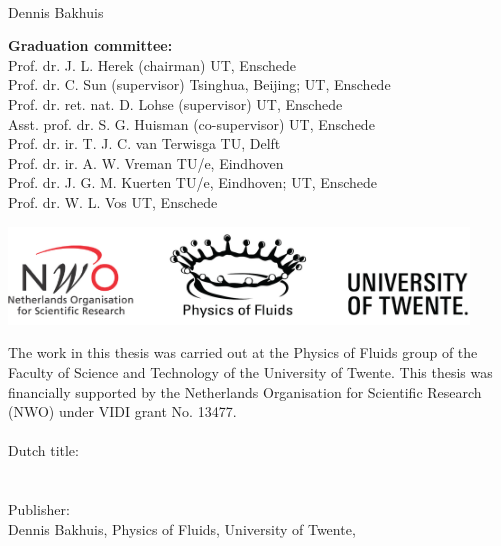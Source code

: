 \thispagestyle{empty}

\vspace{6cm}
\begin{center}
{\Large \thesistitle}\\
\vspace{6cm}
Dennis Bakhuis  %
\end{center}

\newpage
\thispagestyle{empty}
\noindent \textbf{Graduation committee:} \\
Prof. dr. J. L. Herek (chairman) \hfill UT, Enschede\\
Prof. dr. C. Sun (supervisor) \hfill Tsinghua, Beijing; UT, Enschede \\
Prof. dr. ret. nat. D. Lohse (supervisor) \hfill UT, Enschede \\
Asst. prof. dr. S. G. Huisman (co-supervisor) \hfill UT, Enschede \\
Prof. dr. ir. T. J. C. van Terwisga \hfill TU, Delft \\
Prof. dr. ir. A. W. Vreman \hfill TU/e, Eindhoven \\
Prof. dr. J. G. M. Kuerten \hfill TU/e, Eindhoven; UT, Enschede\\
Prof. dr. W. L. Vos \hfill UT, Enschede \\
\vspace{-5mm}
\begin{center}
    \includegraphics[height=26mm]{fig/logos.png}%
\end{center}
\noindent The work in this thesis was carried out at the Physics of Fluids
group of the Faculty of Science and Technology of the University of Twente.
This thesis was financially supported by the Netherlands Organisation for
Scientific Research (NWO) under VIDI grant No. 13477.\\
\vspace{-2mm}\\
\noindent Dutch title: \\
\emph{\thesistitledutch}\\
\vspace{-2mm}\\
\noindent Publisher:\\
Dennis Bakhuis, Physics of Fluids, University of Twente,\\
